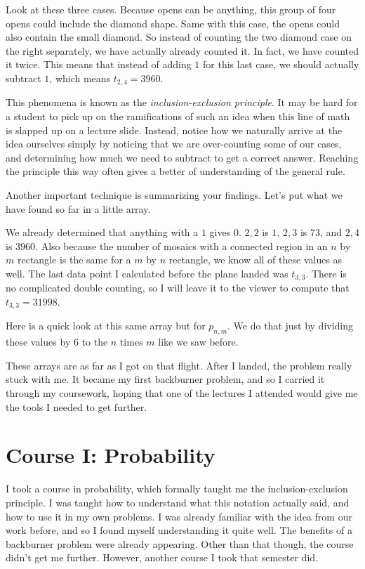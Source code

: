 \documentclass[12pt]{article}
\theoremstyle{plain}
\theoremstyle{definition}
\theoremstyle{remark}
\theoremstyle{definition}
\begin{document}
Look at these three cases. Because opens can be anything, this group of four opens could include the diamond shape. Same with this case, the opens could also contain the small diamond. So instead of counting the two diamond case on the right separately, we have actually already counted it. In fact, we have counted it twice. This means that instead of adding $1$ for this last case, we should actually subtract $1$, which means $t_{2,4} = 3960$. 

This phenomena is known as the \textit{inclusion-exclusion principle}. It may be hard for a student to pick up on the ramifications of such an idea when this line of math is slapped up on a lecture slide. Instead, notice how we naturally arrive at the idea ourselves simply by noticing that we are over-counting some of our cases, and determining how much we need to subtract to get a correct answer. Reaching the principle this way often gives a better of understanding of the general rule.

Another important technique is summarizing your findings. Let's put what we have found so far in a little array. 

We already determined that anything with a $1$ gives $0$. $2,2$ is $1$, $2,3$ is $73$, and $2,4$ is $3960$. Also because the number of mosaics with a connected region in an $n$ by $m$ rectangle is the same for a $m$ by $n$ rectangle, we know all of these values as well. The last data point I calculated before the plane landed was $t_{3,3}$. There is no complicated double counting, so I will leave it to the viewer to compute that $t_{3,3} = 31998$.

Here is a quick look at this same array but for $p_{n,m}$. We do that just by dividing these values by $6$ to the $n$ times $m$ like we saw before.

These arrays are as far as I got on that flight. After I landed, the problem really stuck with me. It became my first backburner problem, and so I carried it through my coursework, hoping that one of the lectures I attended would give me the tools I needed to get further. 

\section{Course I: Probability} %

I took a course in probability, which formally taught me the inclusion-exclusion principle. I was taught how to understand what this notation actually said, and how to use it in my own problems. I was already familiar with the idea from our work before, and so I found myself understanding it quite well. The benefits of a backburner problem were already appearing. Other than that though, the course didn't get me further. However, another course I took that semester did.
\end{document}
